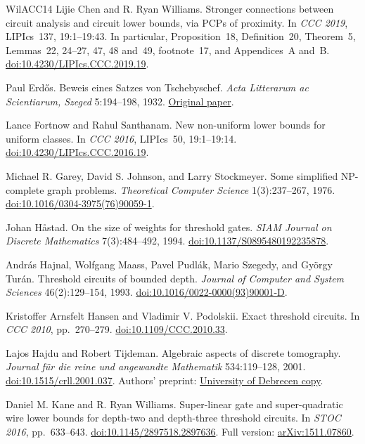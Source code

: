 \documentclass[11pt,letterpaper]{article}
\theoremstyle{definition}
\theoremstyle{remark}
\begin{document}
\begin{thebibliography}{WilACC14}
Lijie Chen and R. Ryan Williams.
Stronger connections between circuit analysis and circuit lower
bounds, via PCPs of proximity.
In \emph{CCC 2019}, LIPIcs~137, 19:1--19:43.
In particular, Proposition~18, Definition~20, Theorem~5, Lemmas~22,
24--27, 47, 48 and~49, footnote~17, and Appendices~A and~B.
\href{https://doi.org/10.4230/LIPIcs.CCC.2019.19}{doi:10.4230/LIPIcs.CCC.2019.19}.

Paul Erd\H{o}s. Beweis eines Satzes von Tschebyschef.
\emph{Acta Litterarum ac Scientiarum, Szeged} 5:194--198, 1932.
\href{https://www.renyi.hu/~p_erdos/1932-01.pdf}{Original paper}.

Lance Fortnow and Rahul Santhanam. New non-uniform lower bounds for
uniform classes. In \emph{CCC 2016}, LIPIcs~50, 19:1--19:14.
\href{https://doi.org/10.4230/LIPIcs.CCC.2016.19}{doi:10.4230/LIPIcs.CCC.2016.19}.

Michael R. Garey, David S. Johnson, and Larry Stockmeyer.
Some simplified NP-complete graph problems.
\emph{Theoretical Computer Science} 1(3):237--267, 1976.
\href{https://doi.org/10.1016/0304-3975(76)90059-1}{doi:10.1016/0304-3975(76)90059-1}.

Johan H\aa{}stad. On the size of weights for threshold gates.
\emph{SIAM Journal on Discrete Mathematics} 7(3):484--492, 1994.
\href{https://doi.org/10.1137/S0895480192235878}{doi:10.1137/S0895480192235878}.

Andr\'as Hajnal, Wolfgang Maass, Pavel Pudl\'ak, Mario Szegedy,
and Gy\"orgy Tur\'an. Threshold circuits of bounded depth.
\emph{Journal of Computer and System Sciences} 46(2):129--154, 1993.
\href{https://doi.org/10.1016/0022-0000(93)90001-D}{doi:10.1016/0022-0000(93)90001-D}.

Kristoffer Arnsfelt Hansen and Vladimir V. Podolskii.
Exact threshold circuits. In \emph{CCC 2010}, pp.~270--279.
\href{https://doi.org/10.1109/CCC.2010.33}{doi:10.1109/CCC.2010.33}.

Lajos Hajdu and Robert Tijdeman. Algebraic aspects of discrete tomography.
\emph{Journal f\"ur die reine und angewandte Mathematik} 534:119--128, 2001.
\href{https://doi.org/10.1515/crll.2001.037}{doi:10.1515/crll.2001.037}.
Authors' preprint:
\href{https://math.unideb.hu/sites/default/files/inline-files/disctom8.pdf}{University of Debrecen copy}.

Daniel M. Kane and R. Ryan Williams.
Super-linear gate and super-quadratic wire lower bounds for depth-two
and depth-three threshold circuits.
In \emph{STOC 2016}, pp.~633--643.
\href{https://doi.org/10.1145/2897518.2897636}{doi:10.1145/2897518.2897636}.
Full version: \href{https://arxiv.org/abs/1511.07860}{arXiv:1511.07860}.


\end{thebibliography}
\end{document}
